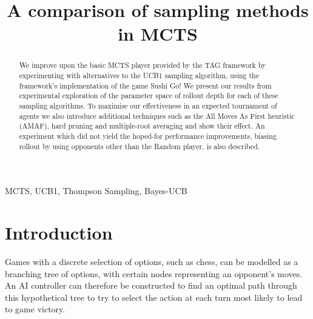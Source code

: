 \documentclass[conference]{IEEEtran}
\begin{document}
\title{A comparison of sampling methods in MCTS\\}
\author{
\and
{}
\and
{}
}

\maketitle

\begin{abstract}
We improve upon the basic MCTS player provided by the TAG framework by experimenting with alternatives to the UCB1 sampling algorithm, using the framework’s implementation of the game Sushi Go! We present our results from experimental exploration of the parameter space of rollout depth for each of these sampling algorithms. To maximise our effectiveness in an expected tournament of agents we also introduce additional techniques such as the All Moves As First heuristic (AMAF), hard pruning and multiple-root averaging and show their effect. An experiment which did not yield the hoped-for performance improvements, biasing rollout by using opponents other than the Random player, is also described. 
\end{abstract}

\begin{IEEEkeywords}
MCTS, UCB1, Thompson Sampling, Bayes-UCB
\end{IEEEkeywords}

\section{Introduction}
Games with a discrete selection of options, such as chess, can be modelled as a branching tree of options, with certain nodes representing an opponent’s moves. An AI controller can therefore be constructed to find an optimal path through this hypothetical tree to try to select the action at each turn most likely to lead to game victory. 
\end{document}

